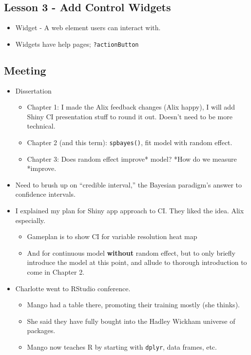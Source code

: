 \documentclass{article}
\begin{document}
\subsection*{Lesson 3 - Add Control Widgets}
\begin{itemize}
\item Widget - A web element users can interact with.
\item Widgets have help pages; \verb|?actionButton|
\end{itemize}


\subsection*{Meeting}
\begin{itemize}
\item Dissertation
        \begin{itemize}
        \item Chapter 1: I made the Alix feedback changes (Alix happy), I will add Shiny CI presentation stuff to round it out. Doesn't need to be more technical.
        \item Chapter 2 (and this term): \verb|spbayes()|, fit model with random effect.
        \item Chapter 3: Does random effect improve* model? *How do we measure *improve.
        \end{itemize}
\item Need to brush up on ``credible interval,'' the Bayesian paradigm's answer to confidence intervals.
\item I explained my plan for Shiny app approach to CI. They liked the idea. Alix especially.
        \begin{itemize}
        \item Gameplan is to show CI for variable resolution heat map
        \item And for continuous model {\bf without} random effect, but to only briefly introduce the model at this point, and allude to thorough introduction to come in Chapter 2.
        \end{itemize}
\item Charlotte went to RStudio conference. 
        \begin{itemize}
        \item Mango had a table there, promoting their training mostly (she thinks). 
        \item She said they have fully bought into the Hadley Wickham universe of packages. 
        \item Mango now teaches R by starting with \verb|dplyr|, data frames, etc. 

\end{itemize}
\end{itemize}
\end{document}
